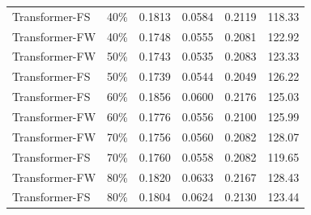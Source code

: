 \begin{longtable}{l c c c c c}
        Transformer-FS & 40\% & 0.1813 & 0.0584 & 0.2119 & 118.33 \\
        Transformer-FW & 40\% & 0.1748 & 0.0555 & 0.2081 & 122.92 \\
        Transformer-FW & 50\% & 0.1743 & 0.0535 & 0.2083 & 123.33 \\
        Transformer-FS & 50\% & 0.1739 & 0.0544 & 0.2049 & 126.22 \\
        Transformer-FS & 60\% & 0.1856 & 0.0600 & 0.2176 & 125.03 \\
        Transformer-FW & 60\% & 0.1776 & 0.0556 & 0.2100 & 125.99 \\
        Transformer-FW & 70\% & 0.1756 & 0.0560 & 0.2082 & 128.07 \\
        Transformer-FS & 70\% & 0.1760 & 0.0558 & 0.2082 & 119.65 \\
        Transformer-FW & 80\% & 0.1820 & 0.0633 & 0.2167 & 128.43 \\
        Transformer-FS & 80\% & 0.1804 & 0.0624 & 0.2130 & 123.44 \\

\end{longtable}
